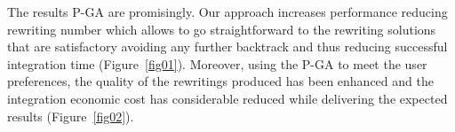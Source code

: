 The results P-GA are promisingly.  
Our approach increases performance reducing rewriting number which allows
to go straightforward to the rewriting solutions that are satisfactory avoiding
any further backtrack and thus reducing successful integration time
(Figure~\ref{fig01}). Moreover, using the P-GA to meet the user preferences, the
quality of the rewritings produced has been enhanced and the integration
economic cost has considerable reduced while delivering the expected results
(Figure~\ref{fig02}). 








